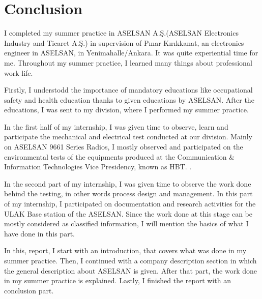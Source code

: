 








\section{Conclusion}

\-
\indent I completed my summer practice in ASELSAN A.Ş.(ASELSAN Electronics Industry and Ticaret A.Ş.) in supervision of Pınar Kırıkkanat, an electronics engineer in ASELSAN, in Yenimahalle/Ankara. It was quite experiential time for me. Throughout my summer practice, I learned many things about professional work life. 

	Firstly, I understodd the importance of mandatory educations like occupational safety and health education thanks to given educations by ASELSAN. After the educations, I was  sent to my division, where I performed my summer practice.
	
	In the first half of my internship, I was given time to observe, learn and participate the mechanical and electrical test conducted at our division. Mainly on ASELSAN 9661 Series Radios, I mostly observed and participated on the environmental tests of the equipments produced at the Communication \& Information Technologies Vice Presidency, known as HBT. .
	
	In the second part of my internship, I was given time to observe the work done behind the testing, in other words process design and management. In this part of my internship, I participated on documentation and research activities for the ULAK Base station of the ASELSAN. Since the work done at this stage can be mostly considered as classified information, I will mention the basics of what I have done in this part.
	
	In this, report, I start with an introduction, that covers what was done in my summer practice. Then, I continued with a company description section in which the general description about ASELSAN is given. After that part, the work done in my summer practice is explained. Lastly, I finished the report with an conclusion part. 
		

